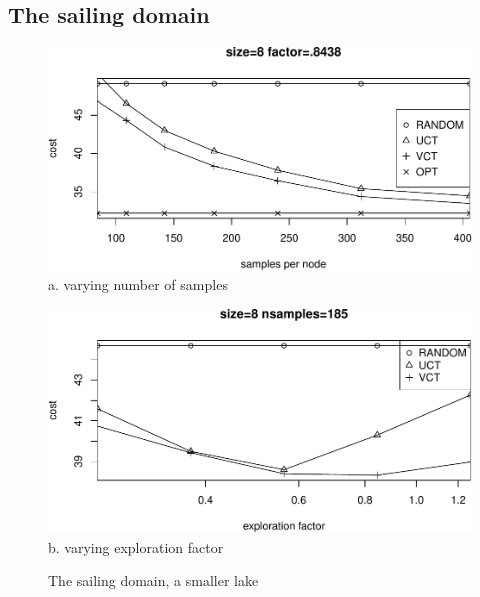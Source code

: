 \documentclass{article}
\begin{document}
\subsection{The sailing domain}


\begin{figure}[t]
  \begin{minipage}[b]{0.5\linewidth} \centering
    \includegraphics[scale=0.45,trim=0pt 0pt 0pt
    0pt,clip]{sailing-size=8-factor=_8438.pdf}
    {a. varying number of samples} 
 \end{minipage}
  \begin{minipage}[b]{0.5\linewidth} \centering
    \includegraphics[scale=0.45,trim=0pt 0pt 0pt
    0pt,clip]{sailing-size=8-nsamples=185.pdf}
    {b. varying exploration factor}
  \end{minipage}
  \caption{The sailing domain, a smaller lake}
  \label{fig:sailing-8}
\end{figure}
\end{document}
